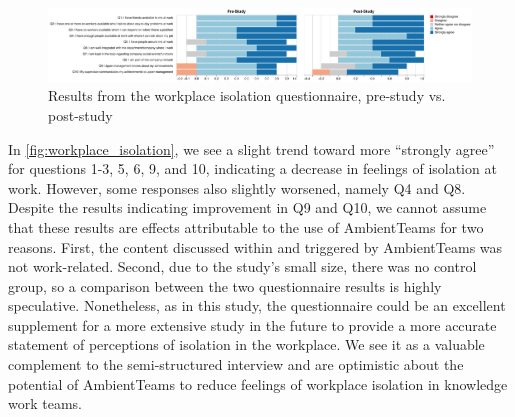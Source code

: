 \begin{figure}[h]
    \centering
    \includegraphics[width=\linewidth]{plots/workplace_isolation_likert.pdf}
    \caption{Results from the workplace isolation questionnaire, pre-study vs. post-study}
    \label{fig:workplace_isolation}
\end{figure}

In \autoref{fig:workplace_isolation}, we see a slight trend toward more \enquote{strongly agree} for questions 1-3, 5, 6, 9, and 10, indicating a decrease in feelings of isolation at work. However, some responses also slightly worsened, namely Q4 and Q8. Despite the results indicating improvement in Q9 and Q10, we cannot assume that these results are effects attributable to the use of AmbientTeams for two reasons. First, the content discussed within and triggered by AmbientTeams was not work-related. Second, due to the study's small size, there was no control group, so a comparison between the two questionnaire results is highly speculative. Nonetheless, as in this study, the questionnaire could be an excellent supplement for a more extensive study in the future to provide a more accurate statement of perceptions of isolation in the workplace. We see it as a valuable complement to the semi-structured interview and are optimistic about the potential of AmbientTeams to reduce feelings of workplace isolation in knowledge work teams.

